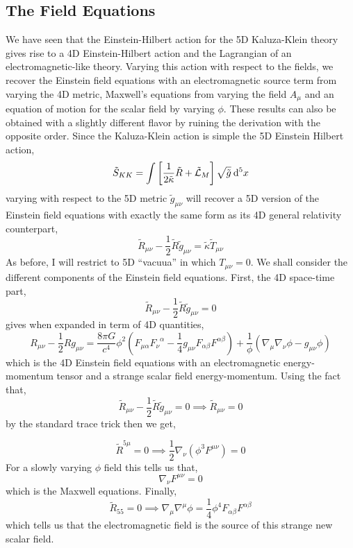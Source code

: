 \documentclass[11pt, a4paper]{article}
\begin{document}
\subsection{The Field Equations}

We have seen that the Einstein-Hilbert action for the 5D Kaluza-Klein theory gives rise to a 4D Einstein-Hilbert action and the Lagrangian of an electromagnetic-like theory. Varying this action with respect to the fields, we recover the Einstein field equations with an electromagnetic source term from varying the 4D metric, Maxwell's equations from varying the field $A_\mu$ and an equation of motion for the scalar field by varying $\phi$. These results can also be obtained with a slightly different flavor by ruining the derivation with the opposite order. Since the Kaluza-Klein action is simple the 5D Einstein Hilbert action,  
\[ \tilde{S}_{KK} = \int \left[ \frac{1}{2 \tilde{\kappa}} \tilde{R} + \tilde{\mathcal{L}}_{M} \right] \sqrt{\tilde{g}} \: \mathrm{d}^{5} x \]
varying with respect to the 5D metric $\tilde{g}_{\mu \nu}$ will recover a 5D version of the Einstein field equations with exactly the same form as its 4D general relativity counterpart,
\[ \tilde{R}_{\mu \nu} - \frac{1}{2} \tilde{R} \tilde{g}_{\mu \nu} = \tilde{\kappa} \tilde{T}_{\mu \nu} \]
As before, I will restrict to 5D ``vacuua'' in which $T_{\mu \nu} = 0$. We shall consider the different components of the Einstein field equations. First, the 4D space-time part,
\[ \tilde{R}_{\mu \nu} - \frac{1}{2} \tilde{R} \tilde{g}_{\mu \nu} = 0\]
gives when expanded in term of 4D quantities,
\[ R_{\mu \nu} - \frac{1}{2} R g_{\mu \nu} = \frac{8 \pi G}{c^4} \phi^2 \left(F_{\mu \alpha} {F_{\nu}}^{\alpha} - \frac{1}{4} g_{\mu \nu} F_{\alpha \beta} F^{\alpha \beta} \right) + \frac{1}{\phi} \left( \nabla_\mu \nabla_\nu \phi - g_{\mu \nu} \phi \right) \]
which is the 4D Einstein field equations with an electromagnetic energy-momentum tensor and a strange scalar field energy-momentum. 
Using the fact that,
\[ \tilde{R}_{\mu \nu} - \frac{1}{2} \tilde{R} \tilde{g}_{\mu \nu} = 0 \implies \tilde{R}_{\mu \nu} = 0\] 
by the standard trace trick then we get,

\[ \tilde{R}^{5 \mu} = 0 \implies \frac{1}{2} \nabla_{\nu} \left( \phi^3 F^{\mu \nu} \right) = 0 \]
For a slowly varying $\phi$ field this tells us that,
\[ \nabla_\nu F^{\mu \nu} = 0 \]
which is the Maxwell equations. 
Finally, 
\[ \tilde{R}_{55} = 0 \implies \nabla_\mu \nabla^\mu \phi = \frac{1}{4} \phi^4 F_{\alpha \beta} F^{\alpha \beta} \]
which tells us that the electromagnetic field is the source of this strange new scalar field. 
\end{document}
